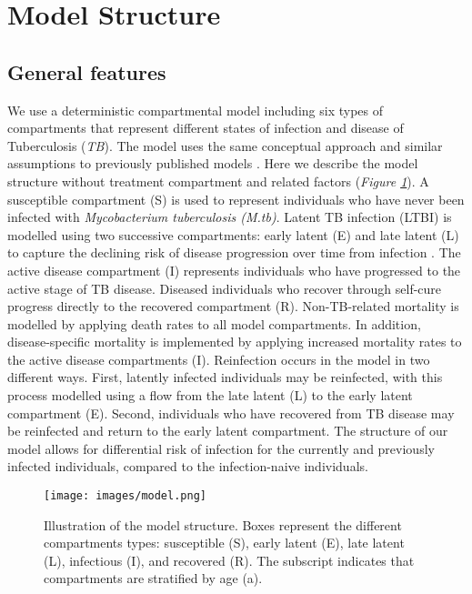 
\section{Model Structure}

\subsection{General features}

We use a deterministic compartmental model including six types of compartments that represent 
different states of infection and disease of Tuberculosis (\emph{TB}). The model uses the same conceptual approach and similar 
assumptions to previously published models \cite{trauer-2017, ragonnet-2019, ragonnet-2021, ragonnet-2022}. 
Here we describe the model structure without treatment compartment and related factors (\emph{Figure \ref{fig:model}}). 
\newline
A susceptible compartment (S) is used to represent individuals who have 
never been infected with \emph{Mycobacterium tuberculosis (M.tb)}. Latent TB infection (LTBI) is modelled 
using two successive compartments: early latent (E) and late latent (L) to capture the declining risk of 
disease progression over time from infection \cite{ragonnet-2017}. The active disease compartment (I) represents 
individuals who have progressed to the active stage of TB disease. Diseased individuals who recover 
through self-cure progress directly to the recovered compartment (R).
\newline
Non-TB-related mortality is modelled by applying death rates to all model compartments. In addition, 
disease-specific mortality is implemented by applying increased mortality rates to the active disease 
compartments (I).
\newline
Reinfection occurs in the model in two different ways. First, latently infected individuals may be 
reinfected, with this process modelled using a flow from the late latent (L) to the early latent 
compartment (E). Second, individuals who have recovered from TB disease may be reinfected and 
return to the early latent compartment. The structure of our model allows for differential risk of 
infection for the currently and previously infected individuals, compared to the infection-naive 
individuals.
\begin{figure}[!htp]
    \texttt{[image: images/model.png]}
    \caption{Illustration of the model structure. 
    Boxes represent the different compartments types: susceptible (S), early latent (E), late latent (L), infectious (I), and recovered (R).
    The subscript indicates that compartments are stratified by age (a).}
    \label{fig:model}
\end{figure}

